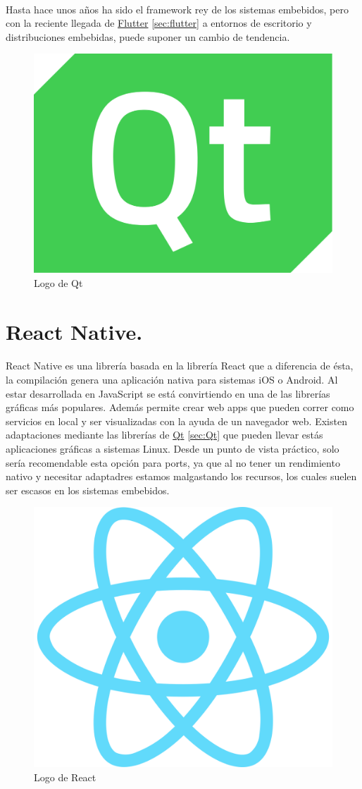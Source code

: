 \paragraph{}Hasta hace unos años ha sido el framework rey de los sistemas embebidos, pero
con la reciente llegada de \hyperref[sec:flutter]{Flutter} \ref{sec:flutter} a entornos
de escritorio y distribuciones embebidas, puede suponer un cambio de tendencia.

\begin{figure}[H]
	\centering
	\includegraphics[width=0.30\linewidth]{imgs/qt}
	\caption[Qt Logo]{Logo de Qt}
	\label{fig:qt}
\end{figure}


\section{React Native.}\label{sec:react}

\paragraph{}React Native es una librería basada en la librería React que a diferencia
de ésta, la compilación genera una aplicación nativa para sistemas iOS o Android. Al
estar desarrollada en JavaScript se está convirtiendo en una de las librerías gráficas
más populares. Además permite crear web apps que pueden correr como servicios en local
y ser visualizadas con la ayuda de un navegador web. Existen adaptaciones mediante las
librerías de \hyperref[sec:Qt]{Qt} \ref{sec:Qt} que pueden llevar estás aplicaciones
gráficas a sistemas Linux. Desde un punto de vista práctico, solo sería recomendable
esta opción para \gls{ports}, ya que al no tener un rendimiento nativo y necesitar
adaptadres estamos malgastando los recursos, los cuales suelen ser escasos en los sistemas
embebidos.

\begin{figure}[H]
	\centering
	\includegraphics[width=0.30\linewidth]{imgs/react-logo}
	\caption[React Logo]{Logo de React}
	\label{fig:react}
\end{figure}

